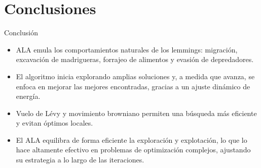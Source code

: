 \documentclass[12pt]{beamer}
\begin{document}
\section{Conclusiones}
\begin{frame}{Conclusión}
  \begin{block}
      \justifying
      \begin{itemize}
    \justifying
          \item ALA emula los comportamientos naturales de los lemmings: migración, excavación de madrigueras, forrajeo de alimentos y evasión de depredadores.
          \item El algoritmo inicia explorando amplias soluciones y, a medida que avanza, se enfoca en mejorar las mejores encontradas, gracias a un ajuste dinámico de energía.
          \item Vuelo de Lévy y movimiento browniano permiten una búsqueda más eficiente y evitan óptimos locales.
          \item El ALA equilibra de forma eficiente la exploración y explotación, lo que lo hace altamente efectivo en problemas de optimización complejos, ajustando su estrategia a lo largo de las iteraciones.
          
      \end{itemize}
      
  \end{block}
\end{frame}
\end{document}

